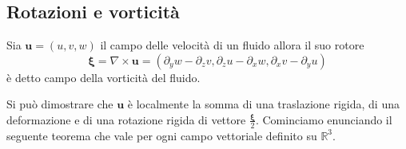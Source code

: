 \subsection{Rotazioni e vorticità}

Sia $\mathbf{u} = (u,v,w)$ il campo delle velocità di un fluido allora il suo rotore 
\begin{equation*}
\boldsymbol{\xi} = \nabla \times \mathbf{u} = (\partial_y w - \partial_z v, \partial_z u - \partial_x w, \partial_x v - \partial_y u)
\end{equation*}
è detto campo della vorticità del fluido.

Si può dimostrare che $\mathbf{u}$ è localmente la somma di una traslazione rigida, di una deformazione e di una rotazione rigida di vettore $\frac{\boldsymbol{\xi}}{2}$. Cominciamo enunciando il seguente teorema che vale per ogni campo vettoriale definito su $\mathbb{R}^3$.

